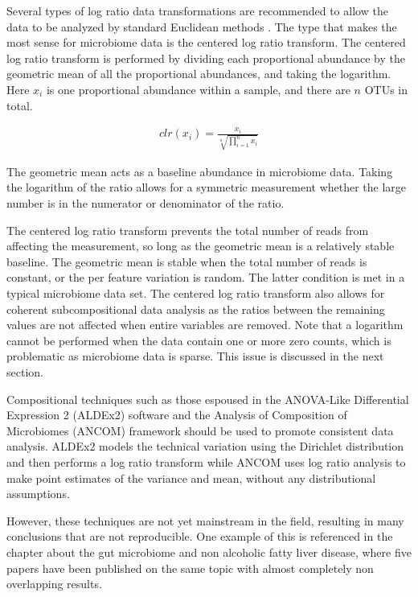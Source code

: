 Several types of log ratio data transformations are recommended to allow the data to be analyzed by standard Euclidean methods \cite{aitchison1982statistical}. The type that makes the most sense for microbiome data is the centered log ratio transform. The centered log ratio transform is performed by dividing each proportional abundance by the geometric mean of all the proportional abundances, and taking the logarithm. Here $x_i$ is one proportional abundance within a sample, and there are $n$ OTUs in total.

\begin{align*}
clr(x_i) = \frac{x_i}{\sqrt[n]{\prod_{i=1}^{n} x_i}}
\end{align*}

The geometric mean acts as a baseline abundance in microbiome data. Taking the logarithm of the ratio allows for a symmetric measurement whether the large number is in the numerator or denominator of the ratio.

The centered log ratio transform prevents the total number of reads from affecting the measurement, so long as the geometric mean is a relatively stable baseline. The geometric mean is stable when the total number of reads is constant, or the per feature variation is random. The latter condition is met in a typical microbiome data set. The centered log ratio transform also allows for coherent subcompositional data analysis as the ratios between the remaining values are not affected when entire variables are removed. Note that a logarithm cannot be performed when the data contain one or more zero counts, which is problematic as microbiome data is sparse. This issue is discussed in the next section.

Compositional techniques such as those espoused in the ANOVA-Like Differential Expression 2 (ALDEx2) software \cite{fernandes2014unifying} and the Analysis of Composition of Microbiomes (ANCOM) framework \cite{mandal2015analysis} should be used to promote consistent data analysis. ALDEx2 models the technical variation using the Dirichlet distribution and then performs a log ratio transform while ANCOM uses log ratio analysis to make point estimates of the variance and mean, without any distributional assumptions.

However, these techniques are not yet mainstream in the field, resulting in many conclusions that are not reproducible. One example of this is referenced in the chapter about the gut microbiome and non alcoholic fatty liver disease, where five papers have been published on the same topic with almost completely non overlapping results.

